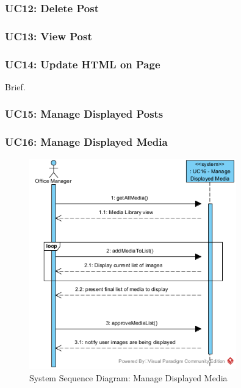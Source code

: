 \documentclass{article}
\begin{document}
\subsubsection{UC12: Delete Post}
\subsubsection{UC13: View Post}
\subsubsection{UC14: Update HTML on Page}
Brief.
\subsubsection{UC15: Manage Displayed Posts}
\subsubsection{UC16: Manage Displayed Media}
\begin{figure}[H]
    \centering
    \includegraphics[width=0.8\textwidth]{images/SSD-UC16-ManageDisplayedMedia.png}
    \centering
    \caption{System Sequence Diagram: Manage Displayed Media}
\end{figure}
\end{document}
